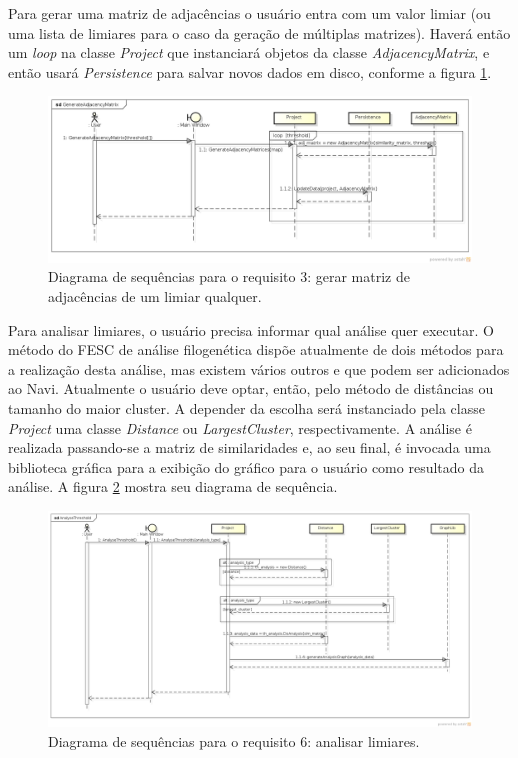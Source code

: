 Para gerar uma matriz de adjacências o usuário entra com um valor limiar (ou uma lista de limiares para o caso da geração de múltiplas matrizes). Haverá
então um \textit{loop} na classe \textit{Project} que instanciará objetos da classe \textit{AdjacencyMatrix}, e então usará \textit{Persistence} para salvar
novos dados em disco, conforme a figura \ref{fig:generate-adjacency-matrix}. \newline

\begin{figure}
\centering
\includegraphics[scale=0.42]{generate-adjacency-matrix}
\caption{Diagrama de sequências para o requisito 3: gerar matriz de adjacências de um limiar qualquer.}
\label{fig:generate-adjacency-matrix}
\end{figure}

Para analisar limiares, o usuário precisa informar qual análise quer executar. O método do FESC de análise filogenética dispõe atualmente de dois métodos
para a realização desta análise, mas existem vários outros e que podem ser adicionados ao Navi. Atualmente o usuário deve optar, então, pelo método de
distâncias ou tamanho do maior cluster. A depender da escolha será instanciado pela classe \textit{Project} uma classe \textit{Distance} ou
\textit{LargestCluster}, respectivamente. A análise é realizada passando-se a matriz de similaridades e, ao seu final, é invocada uma biblioteca gráfica
para a exibição do gráfico para o usuário como resultado da análise. A figura \ref{fig:analyse-threshold} mostra seu diagrama de sequência. \newline

\begin{figure}
\centering
\includegraphics[scale=0.34]{analyse-threshold}
\caption{Diagrama de sequências para o requisito 6: analisar limiares.}
\label{fig:analyse-threshold}
\end{figure}

